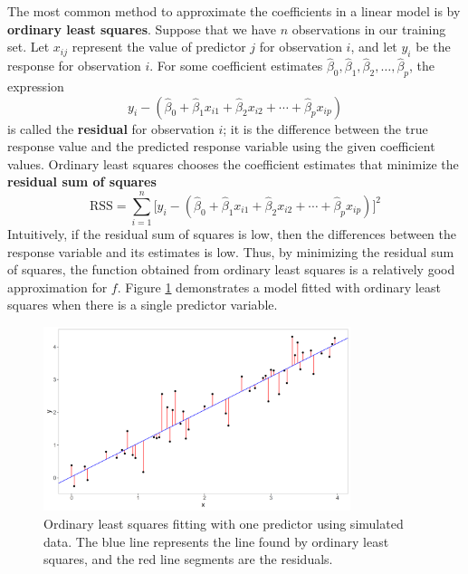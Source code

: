 \documentclass{article}
\begin{document}
The most common method to approximate the coefficients in a linear model is by \textbf{ordinary least squares}. Suppose that we have $n$ observations in our training set. Let $x_{ij}$ represent the value of predictor $j$ for observation $i$, and let $y_i$ be the response for observation $i$. For some coefficient estimates $\hat{\beta}_0, \hat{\beta}_1, \hat{\beta}_2, \dotsc, \hat{\beta}_p$, the expression
\begin{equation}
	y_i - (\hat{\beta}_0 + \hat{\beta}_1 x_{i1} + \hat{\beta}_2 x_{i2} + \cdots + \hat{\beta}_p x_{ip})
\end{equation}
is called the \textbf{residual} for observation $i$; it is the difference between the true response value and the predicted response variable using the given coefficient values. Ordinary least squares chooses the coefficient estimates that minimize the \textbf{residual sum of squares}
\begin{equation}\label{eqn:RSS}
	\text{RSS} = \sum\limits_{i = 1}^n \Big[y_i - (\hat{\beta}_0 + \hat{\beta}_1 x_{i1} + \hat{\beta}_2 x_{i2} + \cdots + \hat{\beta}_p x_{ip})\Big]^2
\end{equation}
Intuitively, if the residual sum of squares is low, then the differences between the response variable and its estimates is low. Thus, by minimizing the residual sum of squares, the function obtained from ordinary least squares is a relatively good approximation for $f$. Figure \ref{fig:ols} demonstrates a model fitted with ordinary least squares when there is a single predictor variable.

\begin{figure}[!h]
	\centering
	\includegraphics[width = 0.8\textwidth]{images/ols.png}
	\captionsetup{width = 0.8\textwidth}
	\caption{Ordinary least squares fitting with one predictor using simulated data. The blue line represents the line found by ordinary least squares, and the red line segments are the residuals.}
	\label{fig:ols}
\end{figure}
\end{document}

